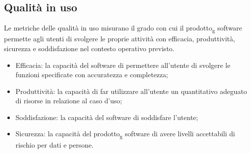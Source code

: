 \subsection{Qualità in uso}
Le metriche delle qualità in uso misurano il grado con cui il prodotto\textsubscript{g} software permette agli utenti di svolgere le proprie attività con efficacia, produttività, sicurezza e soddisfazione nel contesto operativo previsto.
\begin{itemize}
\item Efficacia: la capacità del software di permettere all'utente di svolgere le funzioni specificate con accuratezza e completezza;
\item Produttività: la capacità di far utilizzare all'utente un quantitativo adeguato di risorse in relazione al caso d'uso;
\item Soddisfazione: la capacità del software di soddisfare l'utente;
\item Sicurezza: la capacità del prodotto\textsubscript{g} software di avere livelli accettabili di rischio per dati e persone.
\end{itemize}